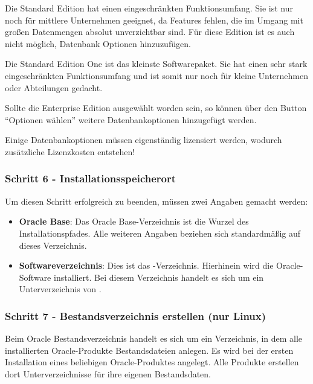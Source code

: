           Die Standard Edition hat einen eingeschränkten Funktionsumfang. Sie ist nur noch für  mittlere Unternehmen geeignet, da Features fehlen, die im Umgang mit großen Datenmengen absolut unverzichtbar sind. Für diese Edition ist es auch nicht möglich, Datenbank Optionen hinzuzufügen.

          Die Standard Edition One ist das kleinste Softwarepaket. Sie hat einen sehr stark eingeschränkten Funktionsumfang und ist somit nur noch für kleine Unternehmen oder Abteilungen gedacht.

          Sollte die Enterprise Edition ausgewählt worden sein, so können über den Button \enquote{Optionen wählen} weitere Datenbankoptionen hinzugefügt werden.

          \begin{merke}
            Einige Datenbankoptionen müssen eigenständig lizensiert werden, wodurch zusätzliche Lizenzkosten entstehen!
          \end{merke}
        \subsubsection{Schritt 6 - Installationsspeicherort}
          Um diesen Schritt erfolgreich zu beenden, müssen zwei Angaben gemacht werden:
          \begin{itemize}
            \item \textbf{Oracle Base}: Das Oracle Base-Verzeichnis ist die Wurzel des Installationspfades. Alle weiteren Angaben beziehen sich standardmäßig auf dieses Verzeichnis.
            \item \textbf{Softwareverzeichnis}: Dies ist das -Verzeichnis. Hierhinein wird die Oracle-Software installiert. Bei diesem Verzeichnis handelt es sich um ein Unterverzeichnis von .
          \end{itemize}
        \subsubsection{Schritt 7 - Bestandsverzeichnis erstellen (nur Linux)}
          Beim Oracle Bestandsverzeichnis handelt es sich um ein Verzeichnis, in dem alle installierten Oracle-Produkte Bestandsdateien anlegen. Es wird bei der ersten Installation eines beliebigen Oracle-Produktes angelegt. Alle Produkte erstellen dort Unterverzeichnisse für ihre eigenen Bestandsdaten.
